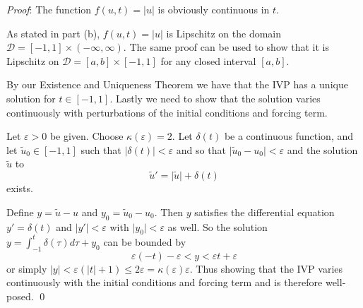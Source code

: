\documentclass[12pt]{article}
\renewenvironment{proof}{\hspace{-4 ex} \emph{Proof}:}{\qed}
\begin{document}
\begin{proof}
	The function $f(u,t) = \vert u \vert$ is obviously continuous in $t$. \bigbreak
	
	As stated in part (b), $f(u,t) = \vert u \vert$ is Lipschitz on the domain $\mathcal{D}=[-1,1] \times (-\infty, \infty)$. The same proof can be used to show that it is Lipschitz on $\mathcal{D}=[a,b] \times [-1,1]$ for any closed interval $[a,b]$. \bigbreak
	
	By our Existence and Uniqueness Theorem we have that the IVP has a unique solution for $t \in [-1, 1]$. Lastly we need to show that the solution varies continuously with perturbations of the initial conditions and forcing term. \bigbreak
	
	Let $\varepsilon > 0$ be given. Choose $\kappa (\varepsilon) = 2$. Let $\delta(t)$ be a continuous function, and let $\tilde u_0 \in [-1,1]$ such that $\vert \delta(t) \vert < \varepsilon$ and so that $\vert \tilde u_0 - u_0 \vert < \varepsilon$ and the solution $\tilde u$ to
	$$
	\tilde u' = \vert \tilde u \vert + \delta(t)
	$$
	exists. \bigbreak
	
	Define $y = \tilde u - u$ and $y_0 = \tilde u_0 - u_0$. Then $y$ satisfies the differential equation
	$y' = \delta(t)$ and $\vert y' \vert < \varepsilon$ with $\vert y_0 \vert < \varepsilon$ as well. So the solution $y = \int_{-1}^t \delta(\tau) d\tau + y_0$ can be bounded by 
	$$
	\varepsilon(-t) - \varepsilon < y < \varepsilon t + \varepsilon
	$$
	or simply $\vert y \vert < \varepsilon (\vert t \vert + 1) \leq 2\varepsilon = \kappa(\varepsilon)\varepsilon$. Thus showing that the IVP varies continuously with the initial conditions and forcing term and is therefore well-posed. 
\end{proof}
\end{document}
